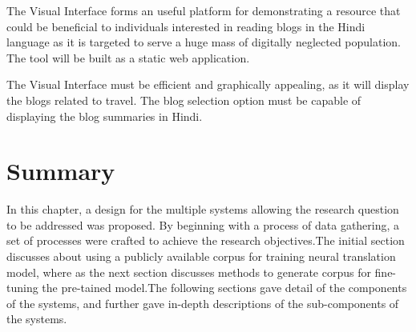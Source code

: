 The Visual Interface forms an useful platform for demonstrating a resource that could be beneficial to individuals interested in reading blogs in the Hindi language as it is targeted to serve a huge mass of digitally neglected population. The tool will be built as a static web application.

The Visual Interface must be efficient and graphically appealing, as it will display the blogs related to travel. The blog selection option must be capable of displaying the blog summaries in Hindi.

\section{Summary}
In this chapter, a design for the multiple systems allowing the research question to be addressed was proposed. By beginning with a process of data gathering, a set of processes were crafted to achieve the research objectives.The initial section discusses about using a publicly available corpus for training neural translation model, where as the next section discusses methods to generate corpus for fine-tuning the pre-tained model.The following sections gave detail of the components of the systems, and further gave in-depth descriptions of the sub-components of the systems.